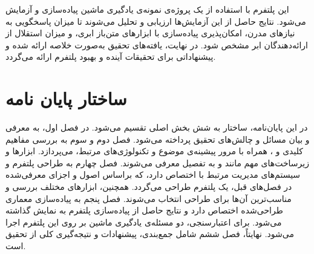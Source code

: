 این پلتفرم با استفاده از یک پروژه‌ی نمونه‌ی یادگیری ماشین پیاده‌سازی و آزمایش می‌شود. نتایج حاصل از این آزمایش‌ها ارزیابی و تحلیل می‌شوند تا میزان پاسخگویی به نیازهای مدرن، امکان‌پذیری پیاده‌سازی با ابزارهای متن‌باز ابری، و میزان استقلال از ارائه‌دهندگان ابر مشخص شود. در نهایت، یافته‌های تحقیق به‌صورت خلاصه ارائه شده و پیشنهاداتی برای تحقیقات آینده و بهبود پلتفرم ارائه می‌گردد.

\section{ساختار پایان نامه}

در این پایان‌نامه، ساختار به شش بخش اصلی تقسیم می‌شود. در فصل اول، به معرفی و بیان مسائل و چالش‌های تحقیق پرداخته می‌شود. فصل دوم و سوم به بررسی مفاهیم کلیدی  و ، همراه با مرور پیشینه‌ی موضوع و تکنولوژی‌های مرتبط، می‌پردازد. ابزارها و زیرساخت‌های مهم مانند  و  به تفصیل معرفی می‌شوند. فصل چهارم به طراحی پلتفرم و سیستم‌های مدیریت مرتبط با  اختصاص دارد، که براساس اصول و اجزای معرفی‌شده در فصل‌های قبل، یک پلتفرم  طراحی می‌گردد. همچنین، ابزارهای مختلف بررسی و مناسب‌ترین آن‌ها برای طراحی انتخاب می‌شوند. فصل پنجم به پیاده‌سازی معماری طراحی‌شده اختصاص دارد و نتایج حاصل از پیاده‌سازی پلتفرم به نمایش گذاشته می‌شود. برای اعتبارسنجی، دو مسئله‌ی یادگیری ماشین بر روی این پلتفرم اجرا می‌شود. نهایتاً، فصل ششم شامل جمع‌بندی، پیشنهادات و نتیجه‌گیری کلی از تحقیق است.
